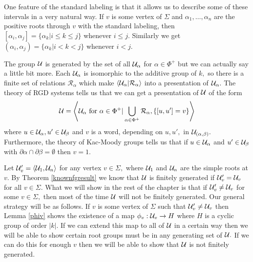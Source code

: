 \documentclass[class=book, crop=false,12 pt]{standalone}
\begin{document}
One feature of the standard labeling is that it allows us to describe some of these intervals in a very natural way. If $v$ is some vertex of $\Sigma$ and $\alpha_1,\dots,\alpha_n$ are the positive roots through $v$ with the standard labeling, then $[\alpha_i,\alpha_j]=\{\alpha_k|i\le k \le j\}$ whenever $i\le j.$ Similarly we get $(\alpha_i,\alpha_j)=\{\alpha_k|i<k<j\}$ whenever $i<j.$

The group $\mathcal{U}$ is generated by the set of all $\mathcal{U}_\alpha$ for $\alpha\in \Phi^+$ but we can actually say a little bit more. Each $\mathcal{U}_\alpha$ is isomorphic to the additive group of $k,$ so there is a finite set of relations $\mathcal{R}_\alpha$ which make $\langle \mathcal{U}_\alpha|\mathcal{R}_\alpha\rangle$ into a presentation of $\mathcal{U}_\alpha.$ The theory of RGD systems tells us that we can get a presentation of $\mathcal{U}$ of the form
\[
	\mathcal{U}=\left\langle \mathcal{U}_\alpha\text{ for }\alpha\in \Phi^+|\bigcup_{\alpha\in \Phi^+}\mathcal{R}_\alpha,\{[u,u']=v\}\right\rangle
\]
where $u\in \mathcal{U}_\alpha,u'\in \mathcal{U}_\beta$ and $v$ is a word, depending on $u,u',$ in $\mathcal{U}_{(\alpha,\beta)}.$ Furthermore, the theory of Kac-Moody groups tells us that if $u\in \mathcal{U}_\alpha$ and $u'\in \mathcal{U}_\beta$ with $\partial\alpha\cap \partial\beta=\emptyset$ then $v=1.$

Let $\mathcal{U}'_v=\langle \mathcal{U}_1,\mathcal{U}_n\rangle$ for any vertex $v\in \Sigma,$ where $\mathcal{U}_1$ and $\mathcal{U}_n$ are the simple roots at $v.$ By Theorem \ref{knownfgresult} we know that $\mathcal{U}$ is finitely generated if $\mathcal{U}'_v=\mathcal{U}_v$ for all $v\in \Sigma.$ What we will show in the rest of the chapter is that if $\mathcal{U}'_v\neq \mathcal{U}_v$ for some $v\in \Sigma,$ then most of the time $\mathcal{U}$ will not be finitely generated. Our general strategy will be as follows. If $v$ is some vertex of $\Sigma$ such that $\mathcal{U}'_v\neq \mathcal{U}_v$ then Lemma \ref{phiv} shows the existence of a map $\phi_v:\mathcal{U}_v\to H$ where $H$ is a cyclic group of order $|k|.$ If we can extend this map to all of $\mathcal{U}$ in a certain way then we will be able to show certain root groups must be in any generating set of $\mathcal{U}.$ If we can do this for enough $v$ then we will be able to show that $\mathcal{U}$ is not finitely generated.
\end{document}
